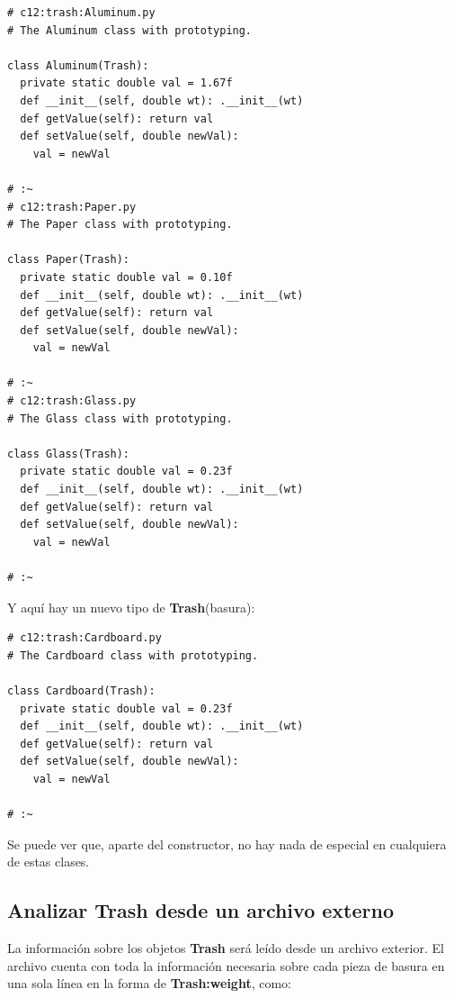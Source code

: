 \documentclass{article}
\begin{document}
\begin{lstlisting} 
# c12:trash:Aluminum.py  
# The Aluminum class with prototyping. 

class Aluminum(Trash): 
  private static double val = 1.67f 
  def __init__(self, double wt): .__init__(wt)  
  def getValue(self): return val  
  def setValue(self, double newVal): 
    val = newVal 
    
# :~ 
# c12:trash:Paper.py  
# The Paper class with prototyping. 

class Paper(Trash): 
  private static double val = 0.10f 
  def __init__(self, double wt): .__init__(wt)  
  def getValue(self): return val  
  def setValue(self, double newVal): 
    val = newVal 
    
# :~ 
# c12:trash:Glass.py  
# The Glass class with prototyping.

class Glass(Trash): 
  private static double val = 0.23f 
  def __init__(self, double wt): .__init__(wt)  
  def getValue(self): return val  
  def setValue(self, double newVal): 
    val = newVal 
    
# :~ 
\end{lstlisting}

Y aquí hay un nuevo tipo de \textbf{Trash}(basura):

\begin{lstlisting} 
# c12:trash:Cardboard.py  
# The Cardboard class with prototyping. 

class Cardboard(Trash): 
  private static double val = 0.23f 
  def __init__(self, double wt): .__init__(wt)  
  def getValue(self): return val  
  def setValue(self, double newVal): 
    val = newVal 
    
# :~ 
\end{lstlisting}

Se puede ver que, aparte del constructor, no hay nada de especial en cualquiera de estas clases.

\subsection{Analizar \textbf{Trash} desde un archivo externo}

La información sobre los objetos \textbf{Trash} será leído desde un archivo exterior. El archivo cuenta con toda la información necesaria sobre cada pieza de basura en una sola línea en la forma de \textbf{Trash:weight}, como:     \newline
\end{document}
